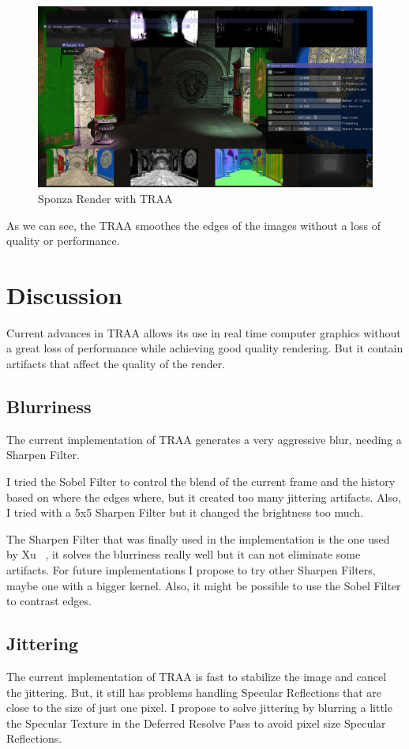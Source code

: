 \documentclass{acmsiggraph}               %
\begin{document}
\begin{figure}[H]
    \centering
    \includegraphics[width=0.9\columnwidth]{TRAA_2.png}
    \caption{Sponza Render with TRAA}
    \label{fig_TRAA_2}
\end{figure}

As we can see, the TRAA smoothes the edges of the images without a loss of quality or performance. 

\section{Discussion}
Current advances in TRAA allows its use in real time computer graphics without a great loss of performance while achieving good quality rendering. But it contain artifacts that affect the quality of the render.

\subsection{Blurriness}
The current implementation of TRAA generates a very aggressive  blur, needing a Sharpen Filter. 

I tried the Sobel Filter to control the blend of the current frame and the history based on where the edges where, but it created too many jittering artifacts. Also, I tried with a 5x5 Sharpen Filter but it changed the brightness too much.

The Sharpen Filter that was finally used in the implementation is the one used by Xu ~\cite{XU2016}, it solves the blurriness really well but it can not eliminate some artifacts. For future implementations I propose to try other Sharpen Filters, maybe one with a bigger kernel. Also, it might be possible to use the Sobel Filter to contrast edges.

\subsection{Jittering}
The current implementation of TRAA is fast to stabilize the image and cancel the jittering. But, it still has problems handling Specular Reflections that are close to the size of just one pixel. I propose to solve jittering by blurring a little the Specular Texture in the Deferred Resolve Pass to avoid pixel size Specular Reflections.
\end{document}
